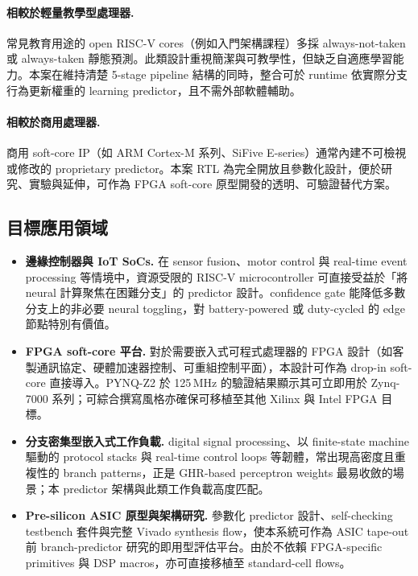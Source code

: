 \documentclass[12pt,a4paper]{article}
\begin{document}
	\paragraph{相較於輕量教學型處理器.}
	常見教育用途的 open RISC-V cores（例如入門架構課程）多採 always-not-taken 或 always-taken 靜態預測。此類設計重視簡潔與可教學性，但缺乏自適應學習能力。本案在維持清楚 5-stage pipeline 結構的同時，整合可於 runtime 依實際分支行為更新權重的 learning predictor，且不需外部軟體輔助。

	\paragraph{相較於商用處理器.}
	商用 soft-core IP（如 ARM Cortex-M 系列、SiFive E-series）通常內建不可檢視或修改的 proprietary predictor。本案 RTL 為完全開放且參數化設計，便於研究、實驗與延伸，可作為 FPGA soft-core 原型開發的透明、可驗證替代方案。

	\subsection{目標應用領域}
	\label{sec:domains}

	\begin{itemize}
		\item \textbf{邊緣控制器與 IoT SoCs.}
		      在 sensor fusion、motor control 與 real-time event processing 等情境中，資源受限的 RISC-V microcontroller 可直接受益於「將 neural 計算聚焦在困難分支」的 predictor 設計。confidence gate 能降低多數分支上的非必要 neural toggling，對 battery-powered 或 duty-cycled 的 edge 節點特別有價值。

		\item \textbf{FPGA soft-core 平台.}
		      對於需要嵌入式可程式處理器的 FPGA 設計（如客製通訊協定、硬體加速器控制、可重組控制平面），本設計可作為 drop-in soft-core 直接導入。PYNQ-Z2 於 125\,MHz 的驗證結果顯示其可立即用於 Zynq-7000 系列；可綜合撰寫風格亦確保可移植至其他 Xilinx 與 Intel FPGA 目標。

		\item \textbf{分支密集型嵌入式工作負載.}
		      digital signal processing、以 finite-state machine 驅動的 protocol stacks 與 real-time control loops 等韌體，常出現高密度且重複性的 branch patterns，正是 GHR-based perceptron weights 最易收斂的場景；本 predictor 架構與此類工作負載高度匹配。

		\item \textbf{Pre-silicon ASIC 原型與架構研究.}
		      參數化 predictor 設計、self-checking testbench 套件與完整 Vivado synthesis flow，使本系統可作為 ASIC tape-out 前 branch-predictor 研究的即用型評估平台。由於不依賴 FPGA-specific primitives 與 DSP macros，亦可直接移植至 standard-cell flows。
	\end{itemize}
\end{document}
